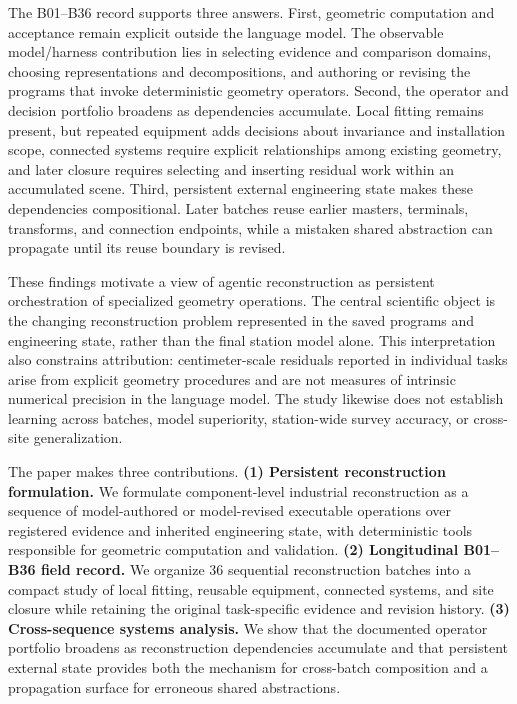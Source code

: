 \documentclass[10pt,a4paper]{article}
\begin{document}
The B01--B36 record supports three answers. First, geometric computation
and acceptance remain explicit outside the language model. The
observable model/harness contribution lies in selecting evidence and
comparison domains, choosing representations and decompositions, and
authoring or revising the programs that invoke deterministic geometry
operators. Second, the operator and decision portfolio broadens as
dependencies accumulate. Local fitting remains present, but repeated
equipment adds decisions about invariance and installation scope,
connected systems require explicit relationships among existing
geometry, and later closure requires selecting and inserting residual
work within an accumulated scene. Third, persistent external engineering
state makes these dependencies compositional. Later batches reuse
earlier masters, terminals, transforms, and connection endpoints, while
a mistaken shared abstraction can propagate until its reuse boundary is
revised.

These findings motivate a view of agentic reconstruction as persistent
orchestration of specialized geometry operations. The central scientific
object is the changing reconstruction problem represented in the saved
programs and engineering state, rather than the final station model
alone. This interpretation also constrains attribution: centimeter-scale
residuals reported in individual tasks arise from explicit geometry
procedures and are not measures of intrinsic numerical precision in the
language model. The study likewise does not establish learning across
batches, model superiority, station-wide survey accuracy, or cross-site
generalization.

The paper makes three contributions. \textbf{(1) Persistent
reconstruction formulation.} We formulate component-level industrial
reconstruction as a sequence of model-authored or model-revised
executable operations over registered evidence and inherited engineering
state, with deterministic tools responsible for geometric computation
and validation. \textbf{(2) Longitudinal B01--B36 field record.} We
organize 36 sequential reconstruction batches into a compact study of
local fitting, reusable equipment, connected systems, and site closure
while retaining the original task-specific evidence and revision
history. \textbf{(3) Cross-sequence systems analysis.} We show that the
documented operator portfolio broadens as reconstruction dependencies
accumulate and that persistent external state provides both the
mechanism for cross-batch composition and a propagation surface for
erroneous shared abstractions.
\end{document}
